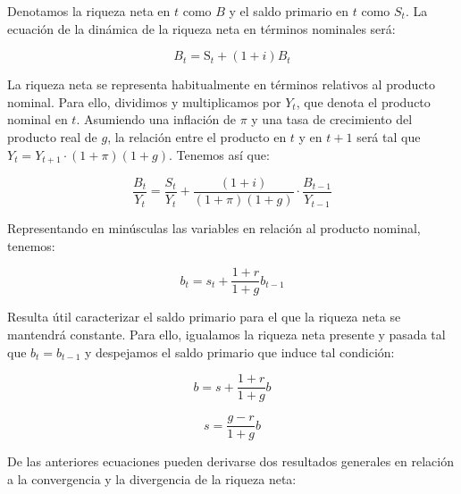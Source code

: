 \documentclass{nuevotema}
\begin{document}
Denotamos la riqueza neta en $t$ como $B$ y el saldo primario en $t$ como $S_t$. La ecuación de la dinámica de la riqueza neta en términos nominales será:

\begin{equation*}
	B_t = \text{S}_t + (1+i)B_t
\end{equation*}

La riqueza neta se representa habitualmente en términos relativos al producto nominal. Para ello, dividimos y multiplicamos por $Y_t$, que denota el producto nominal en $t$. Asumiendo una inflación de $\pi$ y una tasa de crecimiento del producto real de $g$, la relación entre el producto en $t$ y en $t+1$ será tal que $Y_t = Y_{t+1} \cdot (1+\pi) (1+g)$. Tenemos así que:

\begin{equation*}
	\frac{B_t}{Y_t} =  \frac{S_t}{Y_t} + \frac{(1+i)}{(1+\pi) (1+g)} \cdot \frac{B_{t-1}}{Y_{t-1}} 
\end{equation*}

Representando en minúsculas las variables en relación al producto nominal, tenemos:

\begin{equation*}
	b_t = s_t + \frac{1+r}{1+g} b_{t-1}
\end{equation*}

Resulta útil caracterizar el saldo primario para el que la riqueza neta se mantendrá constante. Para ello, igualamos la riqueza neta presente y pasada tal que $b_t = b_{t-1}$ y despejamos el saldo primario que induce tal condición:

\begin{equation*}
	b = s + \frac{1+r}{1+g} b 
\end{equation*}

\begin{equation*}
	s = \frac{g-r}{1+g} b
\end{equation*}

De las anteriores ecuaciones pueden derivarse dos resultados generales en relación a la convergencia y la divergencia de la riqueza neta:
\end{document}
